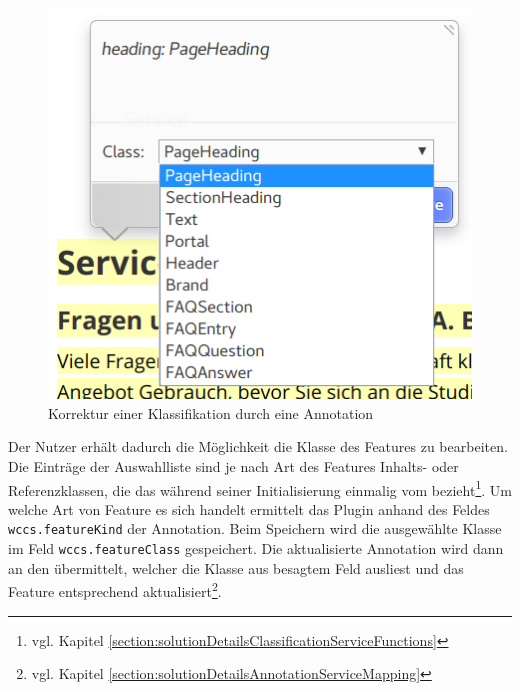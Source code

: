     \begin{figure}[htb]
        \centering
        \includegraphics[scale=\screenshotScaleFactor]{../resources/annotator-plugin/editor.png}
        \caption{Korrektur einer Klassifikation durch eine Annotation}
        \label{image:annotatorPluginEditor}
    \end{figure}

    Der Nutzer erhält dadurch die Möglichkeit die Klasse des Features zu bearbeiten.
    Die Einträge der Auswahlliste sind je nach Art des Features
    Inhalts- oder Referenzklassen, die das {\annotatorPlugin} während seiner
    Initialisierung einmalig vom {\classificationService}
    bezieht\footnote{vgl. Kapitel \ref{section:solutionDetailsClassificationServiceFunctions}}.
    Um welche Art von Feature es sich handelt ermittelt das Plugin anhand des Feldes
    \texttt{wccs.featureKind} der Annotation.
    Beim Speichern wird die ausgewählte Klasse im Feld \texttt{wccs.featureClass} gespeichert.
    Die aktualisierte Annotation wird dann an den {\annotationService} übermittelt,
    welcher die Klasse aus besagtem Feld ausliest und das Feature entsprechend
    aktualisiert\footnote{vgl. Kapitel \ref{section:solutionDetailsAnnotationServiceMapping}}.
